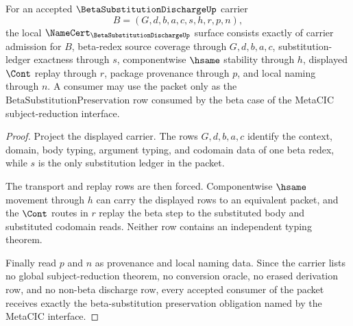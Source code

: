 \begin{theorem}
\label{thm:beta-substitution-discharge-namecert-obligations}
For an accepted $\BetaSubstitutionDischargeUp$ carrier
$$
B=(G,d,b,a,c,s,h,r,p,n),
$$
the local $\NameCert_{\BetaSubstitutionDischargeUp}$ surface consists exactly of carrier admission for $B$, beta-redex source coverage through $G,d,b,a,c$, substitution-ledger exactness through $s$, componentwise $\hsame$ stability through $h$, displayed $\Cont$ replay through $r$, package provenance through $p$, and local naming through $n$. A consumer may use the packet only as the $\mathrm{BetaSubstitutionPreservation}$ row consumed by the beta case of the MetaCIC subject-reduction interface.
\end{theorem}
\begin{proof}
Project the displayed carrier. The rows $G,d,b,a,c$ identify the context, domain, body typing, argument typing, and codomain data of one beta redex, while $s$ is the only substitution ledger in the packet.

The transport and replay rows are then forced. Componentwise $\hsame$ movement through $h$ can carry the displayed rows to an equivalent packet, and the $\Cont$ routes in $r$ replay the beta step to the substituted body and substituted codomain reads. Neither row contains an independent typing theorem.

Finally read $p$ and $n$ as provenance and local naming data. Since the carrier lists no global subject-reduction theorem, no conversion oracle, no erased derivation row, and no non-beta discharge row, every accepted consumer of the packet receives exactly the beta-substitution preservation obligation named by the MetaCIC interface.
\end{proof}


